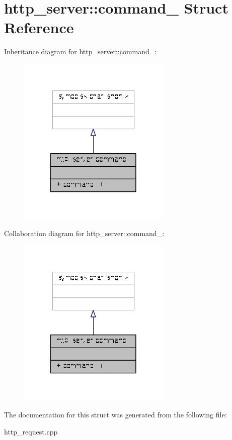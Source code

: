 \hypertarget{structhttp__server_1_1command__}{\section{http\-\_\-server\-:\-:command\-\_\- Struct Reference}
\label{structhttp__server_1_1command__}
}


Inheritance diagram for http\-\_\-server\-:\-:command\-\_\-\-:
\nopagebreak
\begin{figure}[H]
\begin{center}
\leavevmode
\includegraphics[width=206pt]{structhttp__server_1_1command____inherit__graph}
\end{center}
\end{figure}


Collaboration diagram for http\-\_\-server\-:\-:command\-\_\-\-:
\nopagebreak
\begin{figure}[H]
\begin{center}
\leavevmode
\includegraphics[width=206pt]{structhttp__server_1_1command____coll__graph}
\end{center}
\end{figure}


The documentation for this struct was generated from the following file\-:\begin{DoxyCompactItemize}
\item 
http\-\_\-request.\-cpp\end{DoxyCompactItemize}
